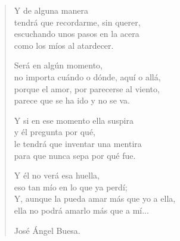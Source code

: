\documentclass[11pt, portrait, twoside, notitlepage, openright]{book}
\begin{document}
\begin{verse}
Y de alguna manera\\
tendrá que recordarme, sin querer,\\
escuchando unos pasos en la acera\\
como los míos al atardecer.
\newline

Será en algún momento,\\
no importa cuándo o dónde, aquí o allá,\\
porque el amor, por parecerse al viento,\\
parece que se ha ido y no se va.
\newline

Y si en ese momento ella suspira\\
y él pregunta por qué,\\
le tendrá que inventar una mentira\\
para que nunca sepa por qué fue.
\newpage

Y él no verá esa huella,\\
eso tan mío en lo que ya perdí;\\
Y, aunque la pueda amar más que yo a ella,\\
ella no podrá amarlo más que a mí...
\newline

\begin{flushright}
José Ángel Buesa.
\end{flushright}
\end{verse}
\end{document}
